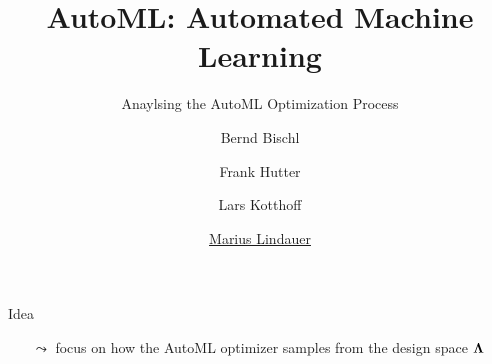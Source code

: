 




\title[AutoML: Overview]{AutoML: Automated Machine Learning}
\subtitle{Anaylsing the AutoML Optimization Process}
\author[Marius Lindauer]{Bernd Bischl \and Frank Hutter \and Lars Kotthoff \and \underline{Marius Lindauer}}
\institute{}
\date{}





	
	\maketitle
	

\begin{frame}[c]{Idea}

\begin{center}
\scalebox{0.9}{
	
}
\end{center}

\begin{itemize}
	\item[$\leadsto$] focus on how the AutoML optimizer samples from the design space $\mathbf{\Lambda}$ 
\end{itemize}

\end{frame}

